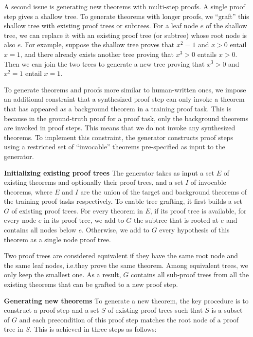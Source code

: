 \documentclass{article}
\begin{document}
A second issue is generating new theorems with multi-step proofs. A single proof step gives a shallow tree. 
To generate theorems with longer proofs, we ``graft'' this shallow tree with existing proof trees or subtrees. For a leaf node $e$ of the shallow tree,  we can replace it with an existing proof tree (or subtree) whose root node is also $e$. For example, suppose the shallow tree proves that $x^2=1$ and $x>0$ entail $x=1$, and there already exists another tree proving that $x^3>0$ entails $x>0$. Then we can join the two trees to generate a new tree proving that $x^3>0$ and $x^2=1$ entail $x=1$. 

To generate theorems and proofs more similar to human-written ones, we impose an additional constraint that a synthesized proof step can only invoke a theorem that has appeared as a background theorem in a training proof task. This is because in the ground-truth proof for a proof task, only the background theorems are invoked in proof steps.  This means that we do not invoke any synthesized theorems. To implement this constraint, the generator constructs proof steps using a restricted set of ``invocable'' theorems pre-specified as input to the generator. 

\noindent\textbf{Initializing existing proof trees}
The generator takes as input a set $E$ of existing theorems and optionally their proof trees, and a set $I$ of invocable theorems, where $E$ and $I$ are the union of the target and background theorems of the training proof tasks respectively.
To enable tree grafting,
it first builds a set $G$ of existing proof trees.
For every theorem in $E$, if its proof tree is available, for every node $e$ in its proof tree, we add to $G$ the subtree that is rooted at $e$ and contains all nodes below $e$. Otherwise, we add to $G$ every hypothesis of this theorem as a single node proof tree. 

Two proof trees are considered equivalent if they have the same root node and the same 
leaf nodes, i.e.\@ they prove the same theorem. Among equivalent trees, we
only keep the smallest one. As a result, $G$ contains all sub-proof trees from all the existing theorems that can be grafted to a new proof step. 

\noindent\textbf{Generating new theorems}
To generate a new theorem,
the key procedure is to construct a proof step and a set $S$ of existing proof trees such that $S$ is a subset of $G$ and 
each precondition of this proof step matches the root node of a proof tree in $S$. This is achieved in three steps as follows: 
\end{document}

